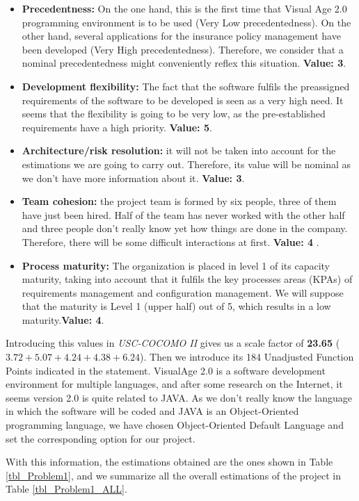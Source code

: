 \begin{itemize}
\item \textbf{Precedentness:} On the one hand, this is the first time that Visual Age 2.0 programming environment is to be used (Very Low precedentedness). On the other hand, several applications for the insurance policy management have been developed (Very High precedentedness). Therefore, we consider that a nominal precedentedness might conveniently reflex this situation. \textbf{Value: 3}.
\item \textbf{Development flexibility:} The fact that the software fulfils the preassigned requirements of the software to be developed is seen as a very high need. It seems that the flexibility is going to be very low, as the pre-established requirements have a high priority. \textbf{Value: 5}.
\item \textbf{Architecture/risk resolution:} it will not be taken into account for the estimations we are going to carry out. Therefore, its value will be nominal as we don't have more information about it. \textbf{Value: 3}.
\item \textbf{Team cohesion:} the project team is formed by six people, three of them have just been hired. Half of the team has never worked with the other half and three people don't really know yet how things are done in the company. Therefore, there will be some difficult interactions at first. \textbf{Value: 4} .
\item \textbf{Process maturity:} The organization is placed in level 1 of its capacity maturity, taking into account that it fulfils the key processes areas (KPAs) of requirements management and configuration management. We will suppose that the maturity is Level 1 (upper half) out of 5, which results in a low maturity.\textbf{Value: 4}.
\end{itemize}

Introducing this values in \textit{USC-COCOMO II} gives us a scale factor of \textbf{23.65} ($3.72+5.07+4.24+4.38+6.24$). Then we introduce its 184 Unadjusted Function Points indicated in the statement. VisualAge 2.0 is a software development environment for multiple languages, and after some research on the Internet, it seems version 2.0 is quite related to JAVA. As we don't really know the language in which the software will be coded and JAVA is an Object-Oriented programming language, we have chosen Object-Oriented Default Language and set the corresponding option for our project.

With this information, the estimations obtained are the ones shown in Table \ref{tbl_Problem1}, and we summarize all the overall estimations of the project in Table \ref{tbl_Problem1_ALL}.

